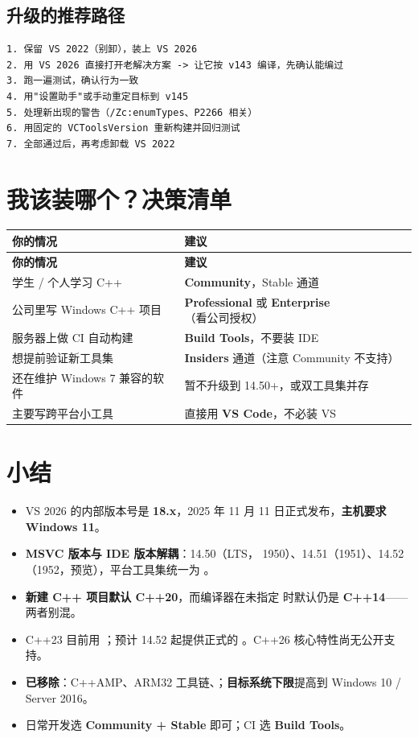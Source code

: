 \subsection{升级的推荐路径}
\begin{lstlisting}[style=textstyle]
1. 保留 VS 2022（别卸），装上 VS 2026
2. 用 VS 2026 直接打开老解决方案 -> 让它按 v143 编译，先确认能编过
3. 跑一遍测试，确认行为一致
4. 用"设置助手"或手动重定目标到 v145
5. 处理新出现的警告（/Zc:enumTypes、P2266 相关）
6. 用固定的 VCToolsVersion 重新构建并回归测试
7. 全部通过后，再考虑卸载 VS 2022
\end{lstlisting}

\section{我该装哪个？决策清单}
\begin{longtable}{L{6.2cm}L{8.8cm}}
\toprule
\textbf{你的情况} & \textbf{建议} \\
\midrule
\endfirsthead
\toprule
\textbf{你的情况} & \textbf{建议} \\
\midrule
\endhead
\bottomrule
\endlastfoot
学生 / 个人学习 C++ & \textbf{Community}，Stable 通道 \\
公司里写 Windows C++ 项目 & \textbf{Professional} 或 \textbf{Enterprise}（看公司授权） \\
服务器上做 CI 自动构建 & \textbf{Build Tools}，不要装 IDE \\
想提前验证新工具集 & \textbf{Insiders} 通道（注意 Community 不支持） \\
还在维护 Windows 7 兼容的软件 & 暂不升级到 14.50+，或双工具集并存 \\
主要写跨平台小工具 & 直接用 \textbf{VS Code}，不必装 VS \\
\end{longtable}

\section{小结}
\begin{itemize}
  \item VS 2026 的内部版本号是 \textbf{18.x}，2025 年 11 月 11 日正式发布，\textbf{主机要求 Windows 11}。
  \item \textbf{MSVC 版本与 IDE 版本解耦}：14.50（LTS， 1950）、14.51（1951）、14.52（1952，预览），平台工具集统一为 \textbf{}。
  \item \textbf{新建 C++ 项目默认 C++20}，而编译器在未指定  时默认仍是 \textbf{C++14}——两者别混。
  \item C++23 目前用 \textbf{}；预计 14.52 起提供正式的 。C++26 核心特性尚无公开支持。
  \item \textbf{已移除}：C++AMP、ARM32 工具链、；\textbf{目标系统下限}提高到 Windows 10 / Server 2016。
  \item 日常开发选 \textbf{Community + Stable} 即可；CI 选 \textbf{Build Tools}。
\end{itemize}

